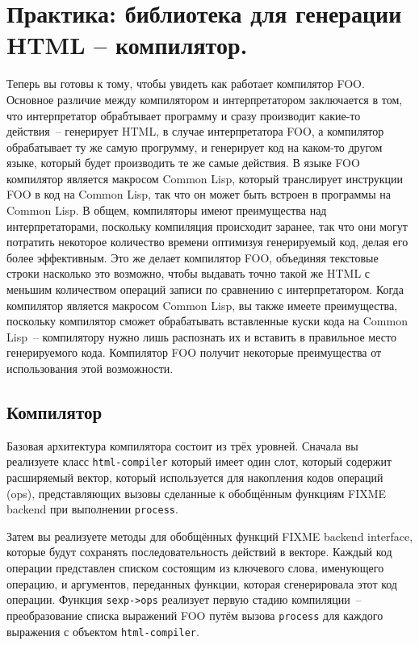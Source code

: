 \chapter{Практика: библиотека для генерации HTML -- компилятор.}
\label{ch:31}

Теперь вы готовы к тому, чтобы увидеть как работает компилятор FOO. Основное различие
между компилятором и интерпретатором заключается в том, что интерпретатор обрабтывает
программу и сразу производит какие-то действия~-- генерирует HTML, в случае интерпретатора
FOO, а компилятор обрабатывает ту же самую прогрумму, и генерирует код на каком-то другом
языке, который будет производить те же самые действия.  В языке FOO компилятор является
макросом Common Lisp, который транслирует инструкции FOO в код на Common Lisp, так что он
может быть встроен в программы на Common Lisp. В общем, компиляторы имеют преимущества над
интерпретаторами, поскольку компиляция происходит заранее, так что они могут потратить
некоторое количество времени оптимизуя генерируемый код, делая его более эффективным.  Это
же делает компилятор FOO, объединяя текстовые строки насколько это возможно, чтобы
выдавать точно такой же HTML с меньшим количеством операций записи по сравнению с
интерпретатором.  Когда компилятор является макросом Common Lisp, вы также имеете
преимущества, поскольку компилятор сможет обрабатывать вставленные куски кода на Common
Lisp~-- компилятору нужно лишь распознать их и вставить в правильное место генерируемого
кода.  Компилятор FOO получит некоторые преимущества от использования этой возможности.

\section{Компилятор}

Базовая архитектура компилятора состоит из трёх уровней.  Сначала вы реализуете класс
\lstinline{html-compiler} который имеет один слот, который содержит расширяемый вектор, который
используется для накопления кодов операций (ops), представляющих вызовы сделанные к
обобщённым функциям FIXME backend при выполнении \lstinline{process}.

Затем вы реализуете методы для обобщённых функций FIXME backend interface, которые будут
сохранять последовательность действий в векторе.  Каждый код операции представлен списком
состоящим из ключевого слова, именующего операцию, и аргументов, переданных функции,
которая сгенерировала этот код операции.  Функция \lstinline{sexp->ops} реализует первую стадию
компиляции~-- преобразование списка выражений FOO путём вызова \lstinline{process} для каждого
выражения с объектом \lstinline{html-compiler}.


